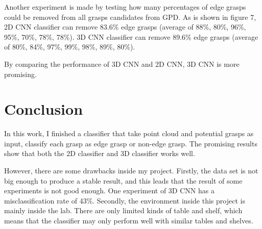 \documentclass[letterpaper]{article} %
\begin{document}
Another experiment is made by testing how many percentages of edge grasps could be removed from all grasps candidates from GPD. As is shown in figure 7, 2D CNN classifier can remove 83.6\% edge grasps (average of 88\%, 80\%, 96\%, 95\%, 70\%, 78\%, 78\%). 3D CNN classifier can remove 89.6\% edge grasps (average of 80\%, 84\%, 97\%, 99\%, 98\%, 89\%, 80\%).



By comparing the performance of 3D CNN and 2D CNN, 3D CNN is more promising.



\section{Conclusion}
In this work, I finished a classifier that take point cloud and potential grasps as input, classify each grasp as edge grasp or non-edge grasp. The promising results show that both the 2D classifier and 3D classifier works well.

However, there are some drawbacks inside my project. Firstly, the data set is not big enough to produce a stable result, and this leads that the result of some experiments is not good enough. One experiment of 3D CNN has a misclassification rate of 43\%. Secondly, the environment inside this project is mainly inside the lab. There are only limited kinds of table and shelf, which means that the classifier may only perform well with similar tables and shelves.



\end{document}
